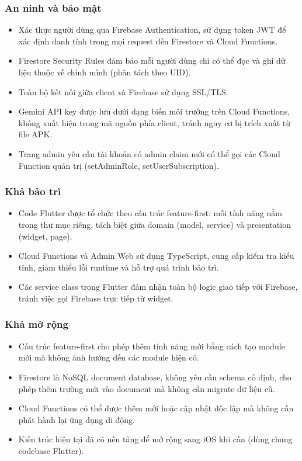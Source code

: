 \subsubsection{An ninh và bảo mật}
\begin{itemize}
    \item Xác thực người dùng qua Firebase Authentication, sử dụng token JWT để xác định danh tính trong mọi request đến Firestore và Cloud Functions.
    \item Firestore Security Rules đảm bảo mỗi người dùng chỉ có thể đọc và ghi dữ liệu thuộc về chính mình (phân tách theo UID).
    \item Toàn bộ kết nối giữa client và Firebase sử dụng SSL/TLS.
    \item Gemini API key được lưu dưới dạng biến môi trường trên Cloud Functions, không xuất hiện trong mã nguồn phía client, tránh nguy cơ bị trích xuất từ file APK.
    \item Trang admin yêu cầu tài khoản có admin claim mới có thể gọi các Cloud Function quản trị (setAdminRole, setUserSubscription).
\end{itemize}

\subsubsection{Khả bảo trì}
\begin{itemize}
    \item Code Flutter được tổ chức theo cấu trúc feature-first: mỗi tính năng nằm trong thư mục riêng, tách biệt giữa domain (model, service) và presentation (widget, page).
    \item Cloud Functions và Admin Web sử dụng TypeScript, cung cấp kiểm tra kiểu tĩnh, giảm thiểu lỗi runtime và hỗ trợ quá trình bảo trì.
    \item Các service class trong Flutter đảm nhận toàn bộ logic giao tiếp với Firebase, tránh việc gọi Firebase trực tiếp từ widget.
\end{itemize}

\subsubsection{Khả mở rộng}
\begin{itemize}
    \item Cấu trúc feature-first cho phép thêm tính năng mới bằng cách tạo module mới mà không ảnh hưởng đến các module hiện có.
    \item Firestore là NoSQL document database, không yêu cầu schema cố định, cho phép thêm trường mới vào document mà không cần migrate dữ liệu cũ.
    \item Cloud Functions có thể được thêm mới hoặc cập nhật độc lập mà không cần phát hành lại ứng dụng di động.
    \item Kiến trúc hiện tại đã có nền tảng để mở rộng sang iOS khi cần (dùng chung codebase Flutter).
\end{itemize}

